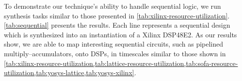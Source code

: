 To demonstrate
  our technique's ability to handle
  sequential logic,
  we run synthesis tasks
  similar to those presented
  in \cref{tab:xilinx-resource-utilization}.
\cref{tab:sequential}
  presents the results.
Each line represents a sequential
  design which is synthesized into
  an instantiation of a Xilinx DSP48E2.
As our results show,
  we are able to map
  interesting sequential circuits,
  such as pipelined multiply--accumulators,
  onto DSPs,
  in timescales similar to those shown in
  \cref{tab:xilinx-resource-utilization,tab:lattice-resource-utilization,tab:sofa-resource-utilization,tab:yosys-lattice,tab:yosys-xilinx}.


